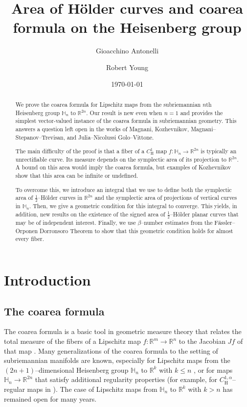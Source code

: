\documentclass[12pt,reqno]{amsart}
\date{\today}
\title{
Area of H\"older curves and coarea formula on the Heisenberg group}
\author{Gioacchino Antonelli}
\author{Robert Young}
\newcommand{\HH}{\mathbb{H}}
\newcommand{\R}{\mathbb{R}}
\newcommand{\from}{\colon}
\theoremstyle{remark}
\newcommand{\0}{\mathbf{0}}
\renewcommand{\1}{\mathbf 1}
\begin{document}
\begin{abstract}
    We prove the coarea formula for Lipschitz maps from the subriemannian $n$th Heisenberg group $\HH_n$ to $\mathbb R^{2n}$. Our result is new even when $n=1$ and provides the simplest vector-valued instance of the coarea formula in subriemannian geometry. This answers a question left open in the works of Magnani, Kozhevnikov, Magnani--Stepanov--Trevisan, and Julia--Nicolussi Golo--Vittone.

    The main difficulty of the proof is that a fiber of a $C^1_{\mathrm{H}}$ map $f\from \HH_n\to \R^{2n}$ is typically an unrectifiable curve. Its measure depends on the symplectic area of its projection to $\R^{2n}$. A bound on this area would imply the coarea formula, but examples of Kozhevnikov show that this area can be infinite or undefined. 

    To overcome this, we introduce an integral that we use to define both the symplectic area of
$\frac{1}{2}$--H\"older curves in $\R^{2n}$ and the symplectic area of projections of vertical
curves in $\mathbb H_n$. Then, we give a geometric condition for this integral to converge. This yields, in addition, new results on the existence of the signed area of $\tfrac12$--H\"older planar
curves that may be of independent interest. Finally, we use $\beta$--number estimates from the F\"assler--Orponen Dorronsoro Theorem to show that this geometric condition holds for almost every fiber.
\end{abstract}

\maketitle
\tableofcontents

\section{Introduction}

\subsection{The coarea formula}\label{Intro}
The coarea formula is a basic tool in geometric measure theory that relates the total measure of the fibers of a Lipschitz map $f\from \R^m\to\R^n$ to the Jacobian $Jf$ of that map \cite[Section 3.2]{FedererBook}. Many generalizations of the coarea formula to the setting of subriemannian manifolds are known, especially for Lipschitz maps from the $(2n+1)$--dimensional Heisenberg group $\HH_n$ to $\R^k$ with $k\leq n$ \cite[Theorem 1.1]{MagnaniAreaImpliesCoarea}, or for maps $\HH_n\to \R^{2n}$ that satisfy additional regularity properties (for example, for  $C^{1,\alpha}_{\mathrm{H}}$--regular maps in \cite{Kozhevnikov, MagnaniStepanovTrevisan}). The case of Lipschitz maps from $\HH_n$ to $\R^k$ with $k> n$ has remained open for many years.
\end{document}
